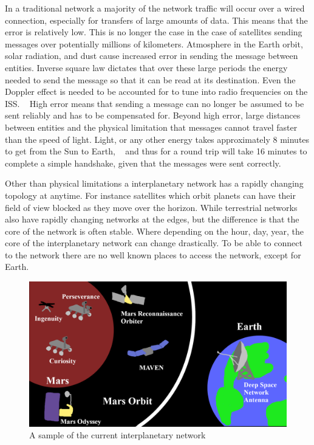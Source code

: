 \documentclass[a4paper,12pt]{article}
\begin{document}
In a traditional network a majority of the network traffic will occur over a wired
connection, especially for transfers of large amounts of data.
This means that the error is relatively low. This is no longer the
case in the case of satellites sending messages over potentially millions of
kilometers. Atmosphere in the Earth orbit, solar radiation, and dust cause
increased error in sending the message between entities. Inverse square law
dictates that over these large periods the energy needed to send the message so
that it can be read at its destination. Even the Doppler effect is needed to be
accounted for to tune into radio frequencies on the ISS. ~\cite{qslCompensatingDoppler} High error means that
sending a message can no longer be assumed to be sent reliably and has to be
compensated for. Beyond high error, large distances between entities and the
physical limitation that messages cannot travel faster than the speed of light.
Light, or any other energy takes approximately 8 minutes to get from the Sun to Earth, ~\cite{nasa_earth} and
thus for a round trip will take 16 minutes to complete a simple handshake, given
that the messages were sent correctly.

Other than physical limitations a interplanetary network has a rapidly changing
topology at anytime. For instance satellites which orbit planets can have their
field of view blocked as they move over the horizon. While terrestrial networks
also have rapidly changing networks at the edges, but the difference is that the
core of the network is often stable. Where depending on the hour, day,
year, the core of the interplanetary network can change drastically. To be able
to connect to the network there are no well known places to access the network,
except for Earth.

\begin{figure}[h]
  \centering
  \includegraphics[width=\textwidth]{media/ipn.png}
  \caption{A sample of the current interplanetary network}
\end{figure}
\end{document}
